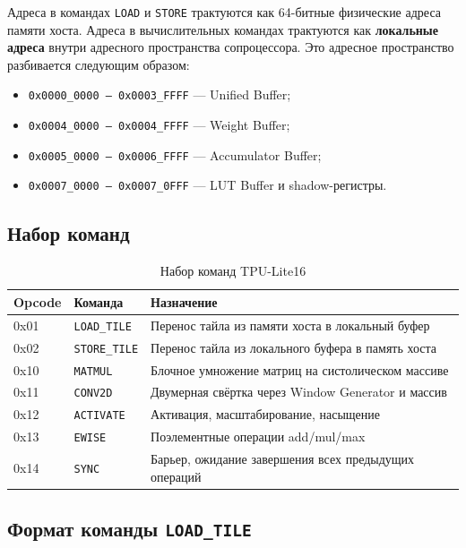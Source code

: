 \documentclass[12pt,a4paper]{article}
\begin{document}
Адреса в командах \texttt{LOAD} и \texttt{STORE} трактуются как 64-битные физические адреса памяти хоста. Адреса в вычислительных командах трактуются как \textbf{локальные адреса} внутри адресного пространства сопроцессора. Это адресное пространство разбивается следующим образом:
\begin{itemize}
    \item \texttt{0x0000\_0000 -- 0x0003\_FFFF} --- Unified Buffer;
    \item \texttt{0x0004\_0000 -- 0x0004\_FFFF} --- Weight Buffer;
    \item \texttt{0x0005\_0000 -- 0x0006\_FFFF} --- Accumulator Buffer;
    \item \texttt{0x0007\_0000 -- 0x0007\_0FFF} --- LUT Buffer и shadow-регистры.
\end{itemize}

\subsection{Набор команд}

\begin{table}[H]
    \centering
    \caption{Набор команд TPU-Lite16}
    \begin{tabular}{|C{1.8cm}|L{3.4cm}|L{8.3cm}|}
        \hline
        \textbf{Opcode} & \textbf{Команда} & \textbf{Назначение} \\
        \hline
        0x01 & \texttt{LOAD\_TILE} & Перенос тайла из памяти хоста в локальный буфер \\
        \hline
        0x02 & \texttt{STORE\_TILE} & Перенос тайла из локального буфера в память хоста \\
        \hline
        0x10 & \texttt{MATMUL} & Блочное умножение матриц на систолическом массиве \\
        \hline
        0x11 & \texttt{CONV2D} & Двумерная свёртка через Window Generator и массив \\
        \hline
        0x12 & \texttt{ACTIVATE} & Активация, масштабирование, насыщение \\
        \hline
        0x13 & \texttt{EWISE} & Поэлементные операции add/mul/max \\
        \hline
        0x14 & \texttt{SYNC} & Барьер, ожидание завершения всех предыдущих операций \\
        \hline
    \end{tabular}
\end{table}

\subsection{Формат команды \texttt{LOAD\_TILE}}
\end{document}
